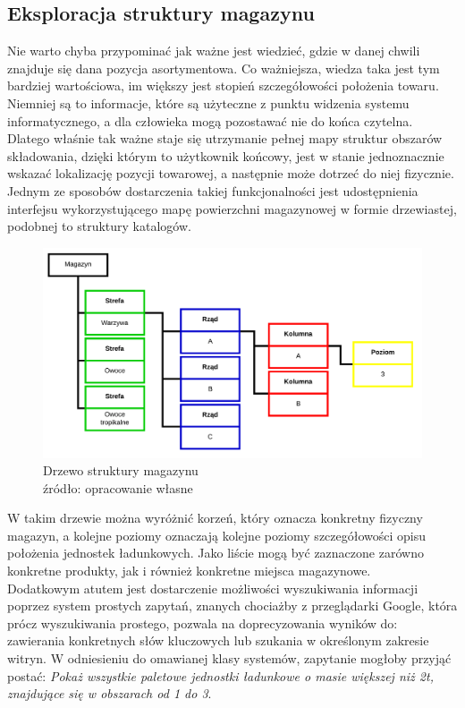 	\subsection{Eksploracja struktury magazynu}
		Nie warto chyba przypominać jak ważne jest wiedzieć, gdzie w danej chwili znajduje się dana pozycja asortymentowa.
		Co ważniejsza, wiedza taka jest tym bardziej wartościowa, im większy jest stopień szczegółowości położenia towaru. 
		Niemniej są to informacje, które są użyteczne z punktu widzenia systemu informatycznego, a dla człowieka mogą
		pozostawać nie do końca czytelna. Dlatego właśnie tak ważne staje się utrzymanie pełnej mapy struktur obszarów
		składowania, dzięki którym to użytkownik końcowy, jest w stanie jednoznacznie wskazać lokalizację pozycji towarowej,
		a następnie może dotrzeć do niej fizycznie. Jednym ze sposobów dostarczenia takiej funkcjonalności jest 
		udostępnienia interfejsu wykorzystującego mapę powierzchni magazynowej w formie drzewiastej, podobnej to 
		struktury katalogów.
		\begin{figure}[H]
			\centering
			\includegraphics[width=1.1\textwidth]{images/warehouse_tree}
			\caption[Przykładowe drzewo eksploracji magazynu]{
				Drzewo struktury magazynu\\
				źródło: opracowanie własne
			}
		\end{figure}
		W takim drzewie można wyróżnić korzeń, który oznacza konkretny fizyczny magazyn, a kolejne poziomy oznaczają 
		kolejne poziomy szczegółowości opisu położenia jednostek ładunkowych. Jako liście mogą być zaznaczone zarówno
		konkretne produkty, jak i również konkretne miejsca magazynowe. \\
		
		Dodatkowym atutem jest dostarczenie możliwości wyszukiwania informacji poprzez system prostych zapytań, 
		znanych chociażby z przeglądarki Google, która prócz wyszukiwania prostego, pozwala na doprecyzowania
		wyników do: zawierania konkretnych słów kluczowych lub szukania w określonym zakresie witryn. W odniesieniu
		do omawianej klasy systemów, zapytanie mogłoby przyjąć postać: \emph{Pokaż wszystkie paletowe jednostki
		ładunkowe o masie większej niż 2t, znajdujące się w obszarach od 1 do 3}. 
